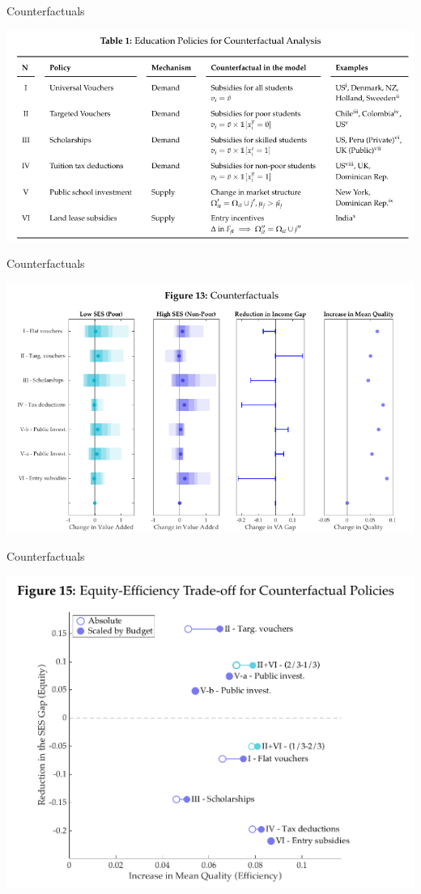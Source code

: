 \documentclass[dvipsnames]{beamer}
\begin{document}
%
\begin{frame}{Counterfactuals}
  \begin{center}
    \includegraphics[width=\textwidth, keepaspectratio=true]{figs/tab1.png}
  \end{center}
\end{frame}
%
\begin{frame}{Counterfactuals}
  \begin{center}
    \includegraphics[width=\textwidth, keepaspectratio=true]{figs/fig13.png}
  \end{center}
\end{frame}
%
\begin{frame}{Counterfactuals}
  \begin{center}
    \includegraphics[width=\textwidth, keepaspectratio=true]{figs/fig15.png}
  \end{center}
\end{frame}
\end{document}
